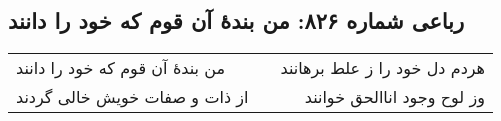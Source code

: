 \begin{center}
\section*{رباعی شماره ۸۲۶: من بندهٔ آن قوم که خود را دانند}
\label{sec:0826}
\begin{longtable}{l p{0.5cm} r}
من بندهٔ آن قوم که خود را دانند
&&
هردم دل خود را ز علط برهانند
\\
از ذات و صفات خویش خالی گردند
&&
وز لوح وجود اناالحق خوانند
\\
\end{longtable}
\end{center}
